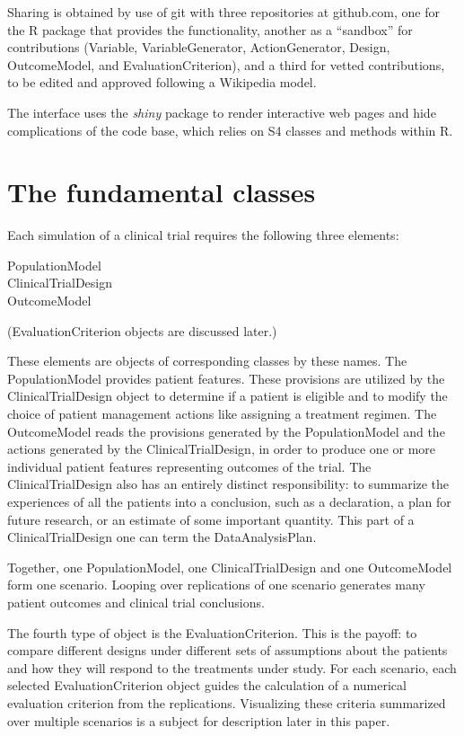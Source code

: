 \documentclass[12pt]{amsart}
\begin{document}
Sharing is obtained by use of git with three repositories at github.com,
one for the R package that provides the functionality,
another as a ``sandbox'' for  contributions (Variable, VariableGenerator, ActionGenerator, Design, OutcomeModel, and EvaluationCriterion),
and a third for vetted contributions,
to be edited and approved following a Wikipedia model.



The interface uses the \emph{shiny} package to render interactive web pages and hide complications of the code base, which relies on S4 classes and methods within R. 


\section{The fundamental classes}

Each simulation of a clinical trial requires the following three elements:
\begin{description}
\item[ PopulationModel]
\item[ ClinicalTrialDesign]
\item[ OutcomeModel]
\end{description}
(EvaluationCriterion objects are discussed later.)

These elements are objects of corresponding classes by these names.
The PopulationModel provides patient features.
These provisions are utilized by the ClinicalTrialDesign object
to determine if a patient is eligible
and to modify the choice of patient management actions
like assigning a treatment regimen.
The OutcomeModel reads the provisions generated by the
PopulationModel and the actions generated by the ClinicalTrialDesign,
in order to produce one or more individual patient features
representing outcomes of the trial.
The ClinicalTrialDesign also has an entirely distinct  responsibility:
to summarize the experiences of all the patients into
a conclusion, such as a declaration, a plan for future research,
or an estimate of some important quantity.
This part of a ClinicalTrialDesign one can term the
DataAnalysisPlan.

Together, one PopulationModel,
one ClinicalTrialDesign and one OutcomeModel
form one scenario.
Looping over replications of one scenario  
generates many patient outcomes and clinical trial conclusions.
 
The fourth type of object is the EvaluationCriterion.
This is the payoff: to compare different designs under
different sets of assumptions about the patients and
how they will respond to the treatments under study.
For each scenario, each selected  EvaluationCriterion object
guides the calculation of a numerical evaluation criterion
from the replications.
Visualizing these criteria summarized over 
multiple scenarios is a subject for description later in this paper.
\end{document}
